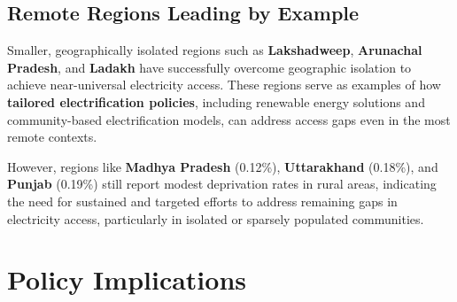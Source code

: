 \documentclass{article}
\begin{document}
\subsection*{Remote Regions Leading by Example}

Smaller, geographically isolated regions such as \textbf{Lakshadweep}, \textbf{Arunachal Pradesh}, and \textbf{Ladakh} have successfully overcome geographic isolation to achieve near-universal electricity access. These regions serve as examples of how \textbf{tailored electrification policies}, including renewable energy solutions and community-based electrification models, can address access gaps even in the most remote contexts.

However, regions like \textbf{Madhya Pradesh} (0.12\%), \textbf{Uttarakhand} (0.18\%), and \textbf{Punjab} (0.19\%) still report modest deprivation rates in rural areas, indicating the need for sustained and targeted efforts to address remaining gaps in electricity access, particularly in isolated or sparsely populated communities.

\section*{ Policy Implications}
\end{document}
